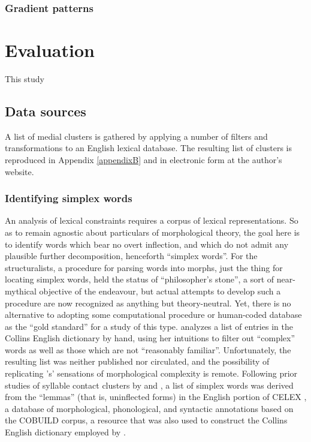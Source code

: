 \subsubsection{Gradient patterns}


\section{Evaluation}

This study 


\subsection{Data sources}

A list of medial clusters is gathered by applying a number of filters and transformations to an English lexical database. The resulting list of clusters is reproduced in Appendix \ref{appendixB} and in electronic form at the author's website.

\subsubsection{Identifying simplex words}

An analysis of lexical constraints requires a corpus of lexical representations. So as to remain agnostic about particulars of morphological theory, the goal here is to identify words which bear no overt inflection, and which do not admit any plausible further decomposition, henceforth ``simplex words''. For the structuralists, a procedure for parsing words into morphs, just the thing for locating simplex words, held the status of ``philosopher's stone'', a sort of near-mythical objective of the endeavour, but actual attempts to develop such a procedure \citep[e.g.,][]{Harris1955,Nida1948} are now recognized as anything but theory-neutral. Yet, there is no alternative to adopting some computational procedure or human-coded database as the ``gold standard'' for a study of this type. \citet{Pierrehumbert1994} analyzes a list of entries in the Collins English dictionary by hand, using her intuitions to filter out ``complex'' words as well as those which are not ``reasonably familiar''. Unfortunately, the resulting list was neither published nor circulated, and the possibility of replicating \citeauthor{Pierrehumbert1994}'s' sensations of morphological complexity is remote. Following prior studies of syllable contact clusters by \citet[ chapter 3]{Hammond1999a} and \citet[ chapter 8]{Duanmu2009}, a list of simplex words was derived from the ``lemmas'' (that is, uninflected forms) in the English portion of CELEX \citep{CELEX}, a database of morphological, phonological, and syntactic annotations based on the COBUILD corpus, a resource that was also used to construct the Collins English dictionary employed by \citeauthor{Pierrehumbert1994}.


